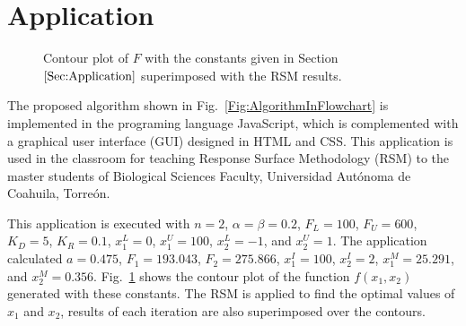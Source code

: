 \documentclass[twocolumn]{svjour3}          %
\begin{document}
\section{Application}
\label{Sec:Application}
\begin{figure}
	\centering
	\caption{Contour plot of $F$ with the constants given in Section~$\ref{Sec:Application}$ superimposed with the RSM results.}
	\label{Fig:Application2Variable}
\end{figure}
The proposed algorithm shown in Fig.~\ref{Fig:AlgorithmInFlowchart} is implemented in the programing language JavaScript, which is complemented with a graphical user interface (GUI) designed in HTML and CSS. This application is used in the classroom for teaching Response Surface Methodology (RSM) to the master students of Biological Sciences Faculty, Universidad Autónoma de Coahuila, Torreón.
\par
This application is executed with $n=2$, $\alpha = \beta = 0.2$, $F_L = 100$, $F_U=600$, $K_D = 5$, $K_R = 0.1$, $x_1^L=0$, $x_1^U=100$, $x_2^L=-1$, and $x_2^U=1$. The application calculated $a= 0.475$, $F_1 = 193.043$, $F_2= 275.866$, $x_1^I=100$, $x_2^I=2$, $x_1^M=25.291$, and $x_2^M=0.356$. Fig.~\ref{Fig:Application2Variable} shows the contour plot of the function $f(x_1,x_2)$ generated with these constants. The RSM is applied to find the optimal values of $x_1$ and $x_2$, results of each iteration are also superimposed over the contours.
\end{document}
